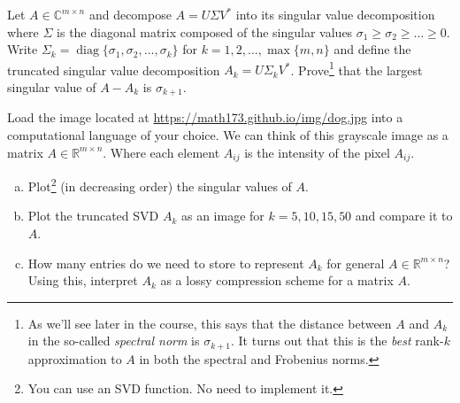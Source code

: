 \documentclass[12pt,letterpaper,cm]{hmcpset}
\begin{document}
\begin{problem}[1]
    
\end{problem}

\begin{solution}
    \vfill
\end{solution}

\begin{problem}[2]
    
\end{problem}

\begin{solution}
    \vfill
\end{solution}

\begin{problem}[3]
    Let $A\in\mathbb{C}^{m\times n}$ and decompose $A = U \Sigma V^*$ into its singular value
    decomposition where $\Sigma$ is the diagonal matrix composed of the singular values
    $\sigma_1\geq\sigma_2\geq \dots\geq 0$. Write $\Sigma_k = \operatorname{diag}\{\sigma_1,\sigma_2
    ,\ldots,\sigma_k\}$ for $k=1,2,\ldots,\max\{m,n\}$ and define the truncated singular value decomposition
    $A_k = U\Sigma_k V^*$. Prove\footnote{As we'll see later in the course, this says that the distance between
    $A$ and $A_k$ in the so-called \emph{spectral norm} is $\sigma_{k+1}$. It turns out that this is the
    \emph{best} rank-$k$ approximation to $A$ in both the spectral and Frobenius norms.}
    that the largest singular value of $A - A_k$ is $\sigma_{k+1}$.
\end{problem}

\begin{solution}
    \vfill
\end{solution}

\begin{problem}[4]
    Load the image located at \url{https://math173.github.io/img/dog.jpg} into a computational language of your choice.
    We can think of this grayscale image as a matrix $A\in\mathbb{R}^{m\times n}$. Where each element $A_{ij}$ is
    the intensity of the pixel $A_{ij}$.
\begin{enumerate}[(a)]
    \item Plot\footnote{You can use an SVD function. No need to implement it.} (in decreasing order) the singular values of $A$.
    \item Plot the truncated SVD $A_k$ as an image for $k=5,10,15,50$ and compare it to $A$.
    \item How many entries do we need to store to represent $A_k$ for general $A\in\mathbb{R}^{m\times n}$?
        Using this, interpret $A_k$ as a lossy compression scheme for a matrix $A$.
\end{enumerate}
\end{problem}

\begin{solution}
    \vfill
\end{solution}
\end{document}
